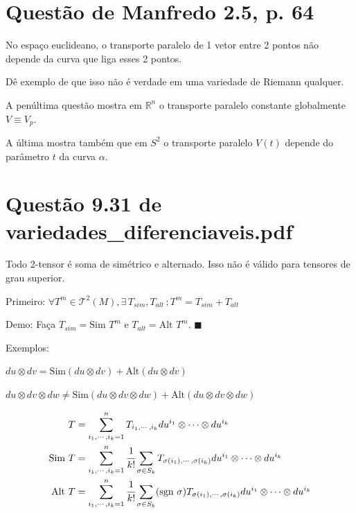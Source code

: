 \documentclass[10pt,a4paper]{article}
\begin{document}
	\section{Quest\~ao de Manfredo 2.5, p. 64}
		\begin{flushright}
		\end{flushright}

		No espa\c{c}o euclideano, o transporte paralelo de 1 vetor entre 2 pontos n\~ao depende da curva que liga esses 2 pontos.

		D\^e exemplo de que isso n\~ao \'e verdade em uma variedade de Riemann qualquer.

		\vspace{3mm}

		A pen\'ultima quest\~ao mostra em $\mathbb{R}^n$ o transporte paralelo constante globalmente $V \equiv V_p$.

		A \'ultima mostra tamb\'em que em $S^2$ o transporte paralelo $V(t)$ depende do par\^ametro $t$ da curva $\alpha$.

	\section{Quest\~ao 9.31 de variedades\_diferenciaveis.pdf}
		\begin{flushright}
		\end{flushright}

		Todo 2-tensor \'e soma de sim\'etrico e alternado. Isso n\~ao \'e v\'alido para tensores de grau superior.

		\vspace{3mm}

		Primeiro: $\forall T^m \in \mathcal{T}^2(M), \exists\, T_{sim}, T_{alt}\,; T^m = T_{sim} + T_{alt}$

		Demo: Fa\c{c}a $T_{sim} = \text{Sim }T^m$ e $T_{alt} = \text{Alt }T^m$.$\,\,\blacksquare$

		\vspace{3mm}

		Exemplos:

		$du \otimes dv = \text{Sim}(du \otimes dv) + \text{Alt}(du \otimes dv)$

		$du \otimes dv \otimes dw \ne \text{Sim}(du \otimes dv \otimes dw) + \text{Alt}(du \otimes dv \otimes dw)$

		\begin{align*}
		T &= \sum_{i_1, \cdots, i_k = 1}^n T_{i_1, \cdots, i_k} du^{i_1}\otimes \cdots \otimes du^{i_k} \\
		\text{Sim } T &= \sum_{i_1, \cdots, i_k = 1}^n \cfrac{1}{k!} \sum_{\sigma \in S_k} T_{\sigma(i_1), \cdots, \sigma(i_k)} du^{i_1}\otimes \cdots \otimes du^{i_k} \\
		\text{Alt } T &= \sum_{i_1, \cdots, i_k = 1}^n \cfrac{1}{k!} \sum_{\sigma \in S_k} (\text{sgn } \sigma) T_{\sigma(i_1), \cdots, \sigma(i_k)} du^{i_1}\otimes \cdots \otimes du^{i_k}
		\end{align*}
\end{document}

